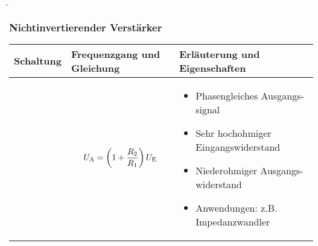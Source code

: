 \begin{frame}
    \b{
    \frametitle{Nichtinvertierender Verstärker}
    \centering
    \begin{table}[ht]
    \label{tab:NichtinvertierenderVerstaerker}
    \begin{tabular}{|m{}|m{}|m{}|}
    \hline
    Schaltung & Frequenzgang und Gleichung & Erläuterung und Eigenschaften\\ %
    \hline
    \vspace{0.5cm}
    \centering
     & 
\vspace{1ex}
\[
U_{\textnormal{A}} = \left(1+\frac{R_2}{R_1}\right) U_{\textnormal{E}}
\]
    &
\begin{itemize}
    \item Phasengleiches Ausgangs-\linebreak signal
    \item Sehr hochohmiger Eingangswiderstand
    \item Niederohmiger Ausgangs-\linebreak widerstand
    \item Anwendungen: z.B. Impedanzwandler
\end{itemize} \\
    \hline
    \end{tabular}
    \end{table}
    }
\end{frame}


